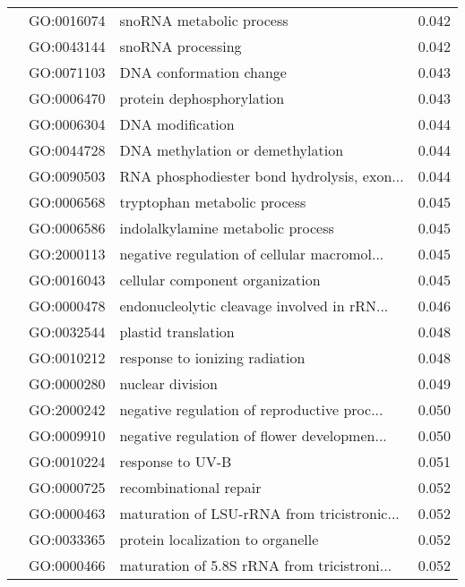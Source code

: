 \begin{longtable}{lllr}
   & GO:0016074 &                     snoRNA metabolic process &         0.042 \\
   & GO:0043144 &                            snoRNA processing &         0.042 \\
   & GO:0071103 &                      DNA conformation change &         0.043 \\
   & GO:0006470 &                    protein dephosphorylation &         0.043 \\
   & GO:0006304 &                             DNA modification &         0.044 \\
   & GO:0044728 &             DNA methylation or demethylation &         0.044 \\
   & GO:0090503 &  RNA phosphodiester bond hydrolysis, exon... &         0.044 \\
   & GO:0006568 &                 tryptophan metabolic process &         0.045 \\
   & GO:0006586 &            indolalkylamine metabolic process &         0.045 \\
   & GO:2000113 &  negative regulation of cellular macromol... &         0.045 \\
   & GO:0016043 &              cellular component organization &         0.045 \\
   & GO:0000478 &  endonucleolytic cleavage involved in rRN... &         0.046 \\
   & GO:0032544 &                          plastid translation &         0.048 \\
   & GO:0010212 &               response to ionizing radiation &         0.048 \\
   & GO:0000280 &                             nuclear division &         0.049 \\
   & GO:2000242 &  negative regulation of reproductive proc... &         0.050 \\
   & GO:0009910 &  negative regulation of flower developmen... &         0.050 \\
   & GO:0010224 &                             response to UV-B &         0.051 \\
   & GO:0000725 &                       recombinational repair &         0.052 \\
   & GO:0000463 &  maturation of LSU-rRNA from tricistronic... &         0.052 \\
   & GO:0033365 &            protein localization to organelle &         0.052 \\
   & GO:0000466 &  maturation of 5.8S rRNA from tricistroni... &         0.052 \\

\end{longtable}
